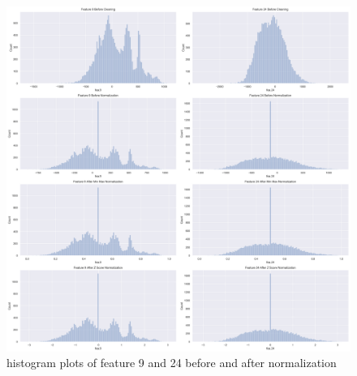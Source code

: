 %
%

\begin{figure}[!ht]
 \centering
\includegraphics[width=6.1in]{assignment1/1-3-histograms.png}
\caption{\label{fig:fig1}histogram plots of feature 9 and 24 before and after normalization}
\end{figure}
